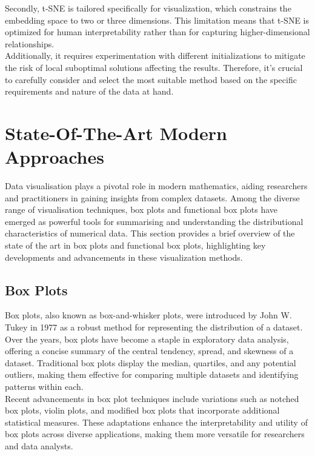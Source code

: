 \documentclass{article}\usepackage[]{graphicx}\usepackage[]{xcolor}
\numberwithin{equation}{section}
\begin{document}
{\noindent
Secondly, t-SNE is tailored specifically for visualization, which constrains the embedding space to two or three dimensions. This limitation means that t-SNE is optimized for human interpretability rather than for capturing higher-dimensional relationships.\\

\noindent
Additionally, it requires experimentation with different initializations to mitigate the risk of local suboptimal solutions affecting the results. Therefore, it's crucial to carefully consider and select the most suitable method based on the specific requirements and nature of the data at hand.\\

\newpage 

\section{State-Of-The-Art Modern Approaches}
Data visualisation plays a pivotal role in modern mathematics, aiding researchers and practitioners in gaining insights from complex datasets. Among the diverse range of visualisation techniques, box plots and functional box plots have emerged as powerful tools for summarising and understanding the distributional characteristics of numerical data. This section provides a brief overview of the state of the art in box plots and functional box plots, highlighting key developments and advancements in these visualization methods.

\subsection{Box Plots}

\noindent Box plots, also known as box-and-whisker plots, were introduced by John W. Tukey in 1977 as a robust method for representing the distribution of a dataset. Over the years, box plots have become a staple in exploratory data analysis, offering a concise summary of the central tendency, spread, and skewness of a dataset. Traditional box plots display the median, quartiles, and any potential outliers, making them effective for comparing multiple datasets and identifying patterns within each.\\

\noindent Recent advancements in box plot techniques include variations such as notched box plots, violin plots, and modified box plots that incorporate additional statistical measures. These adaptations enhance the interpretability and utility of box plots across diverse applications, making them more versatile for researchers and data analysts.

}
\end{document}
